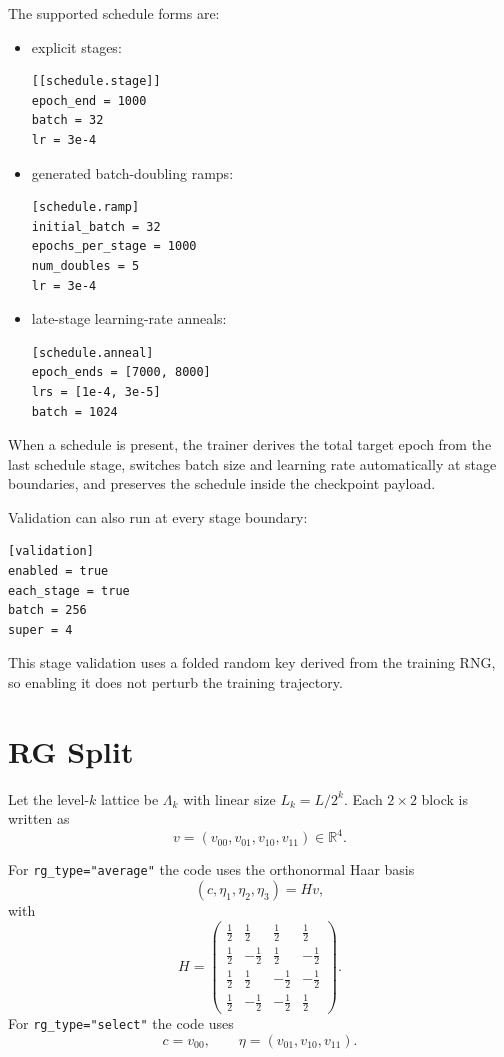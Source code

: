 \documentclass[11pt]{article}
\begin{document}
The supported schedule forms are:
\begin{itemize}
\item explicit stages:
\begin{verbatim}
[[schedule.stage]]
epoch_end = 1000
batch = 32
lr = 3e-4
\end{verbatim}
\item generated batch-doubling ramps:
\begin{verbatim}
[schedule.ramp]
initial_batch = 32
epochs_per_stage = 1000
num_doubles = 5
lr = 3e-4
\end{verbatim}
\item late-stage learning-rate anneals:
\begin{verbatim}
[schedule.anneal]
epoch_ends = [7000, 8000]
lrs = [1e-4, 3e-5]
batch = 1024
\end{verbatim}
\end{itemize}

When a schedule is present, the trainer derives the total target epoch from the
last schedule stage, switches batch size and learning rate automatically at
stage boundaries, and preserves the schedule inside the checkpoint payload.

Validation can also run at every stage boundary:
\begin{verbatim}
[validation]
enabled = true
each_stage = true
batch = 256
super = 4
\end{verbatim}
This stage validation uses a folded random key derived from the training RNG,
so enabling it does not perturb the training trajectory.

\section{RG Split}

Let the level-$k$ lattice be $\Lambda_k$ with linear size $L_k = L / 2^k$.
Each $2 \times 2$ block is written as
\[
v = (v_{00}, v_{01}, v_{10}, v_{11}) \in \mathbb{R}^4.
\]

For \texttt{rg\_type="average"} the code uses the orthonormal Haar basis
\[
(c,\eta_1,\eta_2,\eta_3) = H v,
\]
with
\[
H=
\begin{pmatrix}
\tfrac12 & \tfrac12 & \tfrac12 & \tfrac12 \\
\tfrac12 & -\tfrac12 & \tfrac12 & -\tfrac12 \\
\tfrac12 & \tfrac12 & -\tfrac12 & -\tfrac12 \\
\tfrac12 & -\tfrac12 & -\tfrac12 & \tfrac12
\end{pmatrix}.
\]
For \texttt{rg\_type="select"} the code uses
\[
c=v_{00}, \qquad \eta=(v_{01},v_{10},v_{11}).
\]
\end{document}
